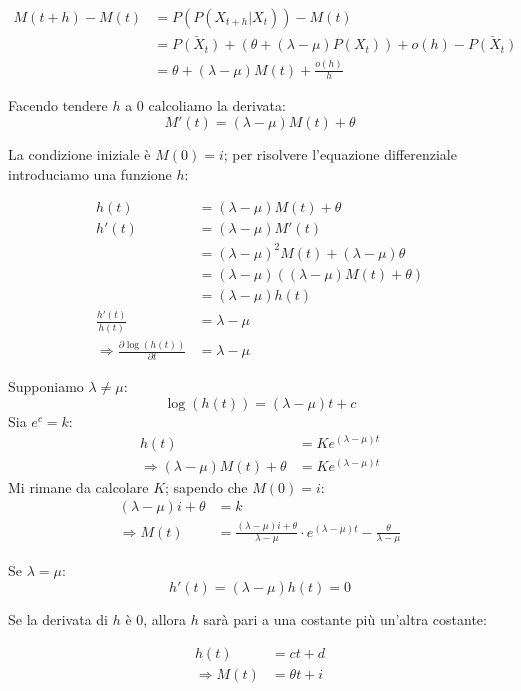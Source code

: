 \documentclass[a4paper,12pt]{book}
\begin{document}
\begin{align*}
	M(t+h) - M(t) & = P(P(X_{t+h} | X_t )) - M(t) \\
	& = \bar{P(X_t)} + (\theta + (\lambda - \mu) P(X_t)) + o(h) - \bar{P(X_t)} \\
	& = \theta + (\lambda - \mu) M(t) + \frac{o(h)}{h} 
\end{align*}

Facendo tendere $ h $ a 0 calcoliamo la derivata:
$$ M'(t) = (\lambda - \mu) M(t) + \theta $$

La condizione iniziale è $ M(0) = i $; per risolvere l'equazione differenziale introduciamo una funzione $ h $:

\begin{align*}
	h(t) & = (\lambda - \mu)M(t) + \theta \\
	h'(t) & = (\lambda - \mu)M'(t) \\
	& = (\lambda - \mu)^2 M(t) + (\lambda - \mu)\theta \\
	& = (\lambda - \mu)((\lambda - \mu)M(t) + \theta) \\
	& = (\lambda - \mu)h(t) \\
	\frac{h'(t)}{h(t)} & = \lambda - \mu \\
	\Rightarrow \frac{\partial \log(h(t))}{\partial t} & = \lambda - \mu
\end{align*}

Supponiamo $ \lambda \ne \mu $:
$$ \log(h(t)) = (\lambda - \mu)t + c $$
Sia $ e^c = k $:
\begin{align*}
	 h(t) & = K e^{(\lambda - \mu)t} \\
	 \Rightarrow (\lambda - \mu)M(t) + \theta & = Ke^{(\lambda - \mu)t}
\end{align*}
Mi rimane da calcolare $ K $; sapendo che $ M(0) = i$:
\begin{align*}
	(\lambda - \mu)i + \theta & = k \\
	\Rightarrow M(t) & = \frac{(\lambda - \mu)i + \theta}{\lambda - \mu} \cdot e^{(\lambda - \mu)t} - \frac{\theta}{\lambda - \mu}
\end{align*}

Se $ \lambda = \mu $:
$$ h'(t) = (\lambda - \mu)h(t) = 0 $$

Se la derivata di $ h $ è 0, allora $ h $ sarà pari a una costante più un'altra costante:

\begin{align*}
	h(t) & = ct + d \\
	\Rightarrow M(t) & = \theta t + i
\end{align*}
\end{document}
